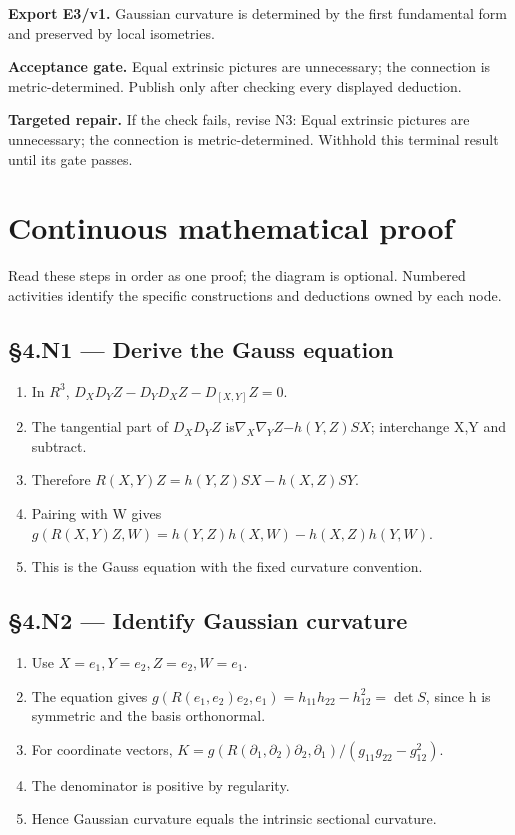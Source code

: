 \documentclass[preprint,12pt,aps,pra,showkeys,amsmath,amssymb,superscriptaddress,floatfix]{revtex4-2}
\theoremstyle{definition}
\theoremstyle{remark}
\newcommand{\field}[2]{\par\smallskip\noindent\textbf{#1.} #2\par}
\begin{document}
\field{Export E3/v1}{Gaussian curvature is determined by the first fundamental form and
preserved by local isometries.}

\field{Acceptance gate}{Equal extrinsic pictures are unnecessary; the connection is
metric-determined. Publish only after checking every displayed
deduction.}

\field{Targeted repair}{If the check fails, revise N3: Equal extrinsic pictures are unnecessary;
the connection is metric-determined. Withhold this terminal result until
its gate passes.}

\endgroup\clearpage\section{Continuous mathematical proof}\label{sec:proof}

Read these steps in order as one proof; the diagram is optional.
Numbered activities identify the specific constructions and deductions
owned by each node.

\subsection{§4.N1 --- Derive the Gauss
equation}\label{n1-derive-the-gauss-equation}

\begin{enumerate}
\def\labelenumi{\arabic{enumi}.}
\item
  In \(R^{3}\), \(D_XD_YZ-D_YD_XZ-D_{[X,Y]}Z\)\(=0\).
\item
  The tangential part of \(D_XD_YZ\)
  is\(\nabla_X\nabla_Y Z\)\(-h(Y,Z)SX\); interchange X,Y and subtract.
\item
  Therefore \(R(X,Y)Z=h(Y,Z)SX-h(X,Z)SY\).
\item
  Pairing with W gives \(g(R(X,Y)Z,W)=h(Y,Z)h(X,W)-h(X,Z)h(Y,W)\).
\item
  This is the Gauss equation with the fixed curvature convention.
\end{enumerate}

\subsection{§4.N2 --- Identify Gaussian
curvature}\label{n2-identify-gaussian-curvature}

\begin{enumerate}
\def\labelenumi{\arabic{enumi}.}
\item
  Use \(X=e_{1},Y=e_{2},Z=e_{2},W=e_{1}\).
\item
  The equation gives
  \(g(R(e_{1},e_{2})e_{2},e_{1})=h_{11}h_{22}-h_{12}^{2}=\operatorname{det} S\),
  since h is symmetric and the basis orthonormal.
\item
  For coordinate vectors,
  \(K=g(R(\partial _{1},\partial _{2})\partial _{2},\partial _{1})/(g_{11}g_{22}-g_{12}^{2})\).
\item
  The denominator is positive by regularity.
\item
  Hence Gaussian curvature equals the intrinsic sectional curvature.
\end{enumerate}
\end{document}
